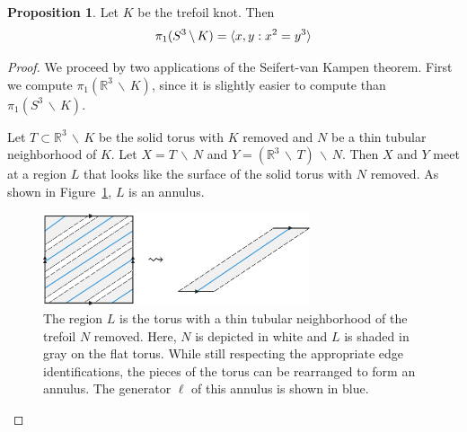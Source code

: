 \documentclass[12pt,twoside]{reedthesis}
\theoremstyle{definition}
\newtheorem{prop}[thm]{Proposition}
\newcommand{\R}{\mathbb{R}}
\newcommand{\wo}{\, \backslash \,}
\DeclarePairedDelimiter\ang{\langle}{\rangle}
\begin{document}
\begin{prop}
  Let $K$ be the trefoil knot.
  Then
  \begin{equation*}
    \pi_1(S^3 \wo K) = \ang{x, y : x^2 = y^3}
  \end{equation*}
\end{prop}

\begin{proof}
  We proceed by two applications of the Seifert-van Kampen theorem.
  First we compute $\pi_1(\R^3 \wo K)$, since it is slightly easier to compute than $\pi_1(S^3 \wo K)$.

  Let $T \subset \R^3 \wo K$ be the solid torus with $K$ removed and $N$ be a thin tubular neighborhood of $K$.
  Let $X = T \wo N$ and $Y = (\R^3 \wo T) \wo N$.
  Then $X$ and $Y$ meet at a region $L$ that looks like the surface of the solid torus with $N$ removed.
  As shown in Figure~\ref{fig:flat_annulus}, $L$ is an annulus.

  \begin{figure}[h]
    \centering
    \includegraphics[width=0.7\textwidth]{figures/fundamental_group_flat.pdf}
    \caption{The region $L$ is the torus with a thin tubular neighborhood of the trefoil $N$ removed. Here, $N$ is depicted in white and $L$ is shaded in gray on the flat torus. While still respecting the appropriate edge identifications, the pieces of the torus can be rearranged to form an annulus. The generator $\ell$ of this annulus is shown in blue.}
    \label{fig:flat_annulus}
  \end{figure}


\end{proof}
\end{document}
